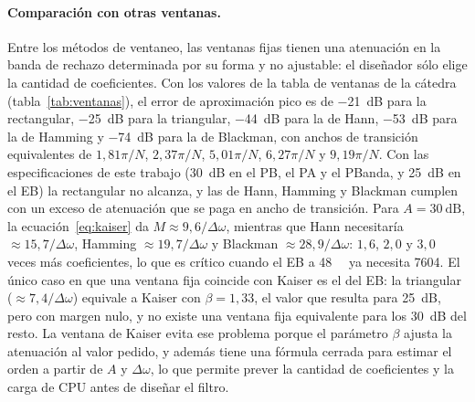 \documentclass[11pt,a4paper]{article}
\begin{document}
\paragraph{Comparación con otras ventanas.} Entre los métodos de ventaneo, las
ventanas fijas tienen una atenuación en la banda de rechazo determinada por su
forma y no ajustable: el diseñador sólo elige la cantidad de coeficientes. Con
los valores de la tabla de ventanas de la cátedra (tabla~\ref{tab:ventanas}), el error de aproximación
pico es de \qty{-21}{\deci\bel} para la rectangular, \qty{-25}{\deci\bel} para
la triangular, \qty{-44}{\deci\bel} para la de Hann, \qty{-53}{\deci\bel} para
la de Hamming y \qty{-74}{\deci\bel} para la de Blackman, con anchos de
transición equivalentes de $1{,}81\pi/N$, $2{,}37\pi/N$, $5{,}01\pi/N$,
$6{,}27\pi/N$ y $9{,}19\pi/N$. Con las especificaciones de este trabajo
(\qty{30}{\deci\bel} en el PB, el PA y el PBanda, y \qty{25}{\deci\bel} en el
EB) la rectangular no alcanza, y las de Hann, Hamming y Blackman cumplen con un
exceso de atenuación que se paga en ancho de transición. Para $A =
\qty{30}{\deci\bel}$, la ecuación~\eqref{eq:kaiser} da $M \approx
9{,}6/\Delta\omega$, mientras que Hann necesitaría $\approx 15{,}7/\Delta\omega$,
Hamming $\approx 19{,}7/\Delta\omega$ y Blackman $\approx 28{,}9/\Delta\omega$:
$1{,}6$, $2{,}0$ y $3{,}0$ veces más coeficientes, lo que es
crítico cuando el EB a \qty{48}{\kilo\sps} ya necesita \num{7604}. El único
caso en que una ventana fija coincide con Kaiser es el del EB: la triangular
($\approx 7{,}4/\Delta\omega$) equivale a Kaiser con $\beta = 1{,}33$, el valor
que resulta para \qty{25}{\deci\bel}, pero con margen nulo, y no existe una
ventana fija equivalente para los \qty{30}{\deci\bel} del resto. La ventana de
Kaiser evita ese problema porque el parámetro $\beta$ ajusta la atenuación al
valor pedido, y además tiene una fórmula cerrada para estimar el orden a partir
de $A$ y $\Delta\omega$, lo que permite prever la cantidad de coeficientes y la
carga de CPU antes de diseñar el filtro.
\end{document}
